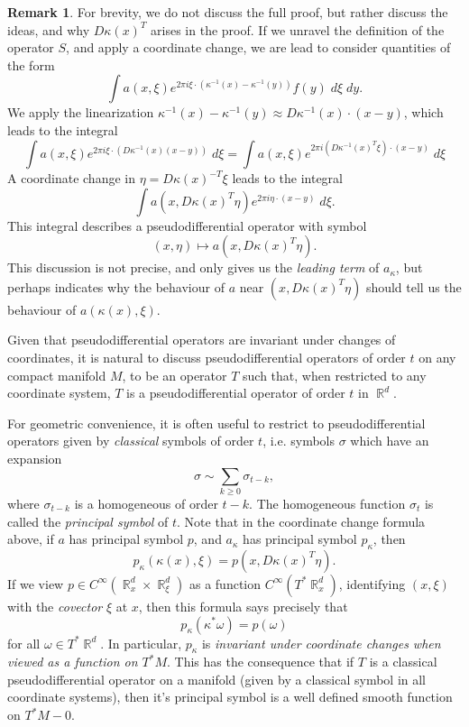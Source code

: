 \documentclass{article}
\DeclareMathOperator{\RR}{\mathbb{R}}
\theoremstyle{plain}
\theoremstyle{definition}
\newtheorem*{remark}{Remark}
\begin{document}
\begin{remark}
    For brevity, we do not discuss the full proof, but rather discuss the ideas, and why $D\kappa(x)^T$ arises in the proof. If we unravel the definition of the operator $S$, and apply a coordinate change, we are lead to consider quantities of the form
    \[ \int a(x,\xi) e^{2 \pi i \xi \cdot (\kappa^{-1}(x) - \kappa^{-1}(y))} f(y)\; d\xi\; dy. \]
    We apply the linearization $\kappa^{-1}(x) - \kappa^{-1}(y) \approx D\kappa^{-1}(x) \cdot (x - y)$, which leads to the integral
    \[ \int a(x, \xi) e^{2 \pi i \xi \cdot (D\kappa^{-1}(x) (x - y))}\; d\xi = \int a(x, \xi) e^{2 \pi i (D\kappa^{-1}(x)^T \xi) \cdot (x - y)}\; d \xi \]
    A coordinate change in $\eta = D\kappa(x)^{-T} \xi$ leads to the integral
    \[ \int a(x, D\kappa(x)^T \eta) e^{2 \pi i \eta \cdot (x - y)}\; d\xi. \]
    This integral describes a pseudodifferential operator with symbol
    \[ (x,\eta) \mapsto a(x, D\kappa(x)^T \eta). \]
    This discussion is not precise, and only gives us the \emph{leading term} of $a_\kappa$, but perhaps indicates why the behaviour of $a$ near $(x, D\kappa(x)^T \eta)$ should tell us the behaviour of $a(\kappa(x),\xi)$.
\end{remark}

Given that pseudodifferential operators are invariant under changes of coordinates, it is natural to discuss pseudodifferential operators of order $t$ on any compact manifold $M$, to be an operator $T$ such that, when restricted to any coordinate system, $T$ is a pseudodifferential operator of order $t$ in $\RR^d$.

For geometric convenience, it is often useful to restrict to pseudodifferential operators given by \emph{classical} symbols of order $t$, i.e. symbols $\sigma$ which have an expansion
%
\[ \sigma \sim \sum_{k \geq 0} \sigma_{t - k}, \]
%
where $\sigma_{t - k}$ is a homogeneous of order $t - k$. The homogeneous function $\sigma_t$ is called the \emph{principal symbol} of $t$. Note that in the coordinate change formula above, if $a$ has principal symbol $p$, and $a_\kappa$ has principal symbol $p_\kappa$, then
%
\[ p_\kappa(\kappa(x), \xi) = p(x, D\kappa(x)^T \eta). \]
%
If we view $p \in C^\infty(\RR^d_x \times \RR^d_\xi)$ as a function $C^\infty(T^* \RR^d_x)$, identifying $(x,\xi)$ with the \emph{covector} $\xi$ at $x$, then this formula says precisely that
%
\[ p_\kappa( \kappa^* \omega) = p( \omega ) \]
%
for all $\omega \in T^* \RR^d$. In particular, $p_\kappa$ is \emph{invariant under coordinate changes when viewed as a function on $T^* M$}. This has the consequence that if $T$ is a classical pseudodifferential operator on a manifold (given by a classical symbol in all coordinate systems), then it's principal symbol is a well defined smooth function on $T^* M - 0$.
\end{document}
